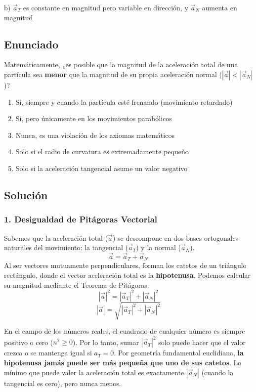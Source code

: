 \documentclass[12pt, a4paper]{article}
\begin{document}
\begin{tcolorbox}[colback=green!5!white, colframe=green!50!black, title=Respuesta Final]
\centering \Large b) $\vec{a}_T$ es constante en magnitud pero variable en dirección, y $\vec{a}_N$ aumenta en magnitud
\end{tcolorbox}

\newpage

\subsection*{Enunciado}
Matemáticamente, ¿es posible que la magnitud de la aceleración total de una partícula sea \textbf{menor} que la magnitud de su propia aceleración normal ($|\vec{a}| < |\vec{a}_N|$)?
\begin{enumerate}[label=\alph*)]
    \item Sí, siempre y cuando la partícula esté frenando (movimiento retardado)
    \item Sí, pero únicamente en los movimientos parabólicos
    \item Nunca, es una violación de los axiomas matemáticos
    \item Solo si el radio de curvatura es extremadamente pequeño
    \item Solo si la aceleración tangencial asume un valor negativo
\end{enumerate}

\subsection*{Solución}

\subsubsection*{1. Desigualdad de Pitágoras Vectorial}
Sabemos que la aceleración total ($\vec{a}$) se descompone en dos bases ortogonales naturales del movimiento: la tangencial ($\vec{a}_T$) y la normal ($\vec{a}_N$).
$$ \vec{a} = \vec{a}_T + \vec{a}_N $$
Al ser vectores mutuamente perpendiculares, forman los catetos de un triángulo rectángulo, donde el vector aceleración total es la \textbf{hipotenusa}. Podemos calcular su magnitud mediante el Teorema de Pitágoras:
$$ |\vec{a}|^2 = |\vec{a}_T|^2 + |\vec{a}_N|^2 $$
$$ |\vec{a}| = \sqrt{|\vec{a}_T|^2 + |\vec{a}_N|^2} $$

En el campo de los números reales, el cuadrado de cualquier número es siempre positivo o cero ($n^2 \ge 0$). Por lo tanto, sumar $|\vec{a}_T|^2$ solo puede hacer que el valor crezca o se mantenga igual si $a_T = 0$.
Por geometría fundamental euclidiana, \textbf{la hipotenusa jamás puede ser más pequeña que uno de sus catetos}. Lo mínimo que puede valer la aceleración total es exactamente $|\vec{a}_N|$ (cuando la tangencial es cero), pero nunca menos.
\end{document}

